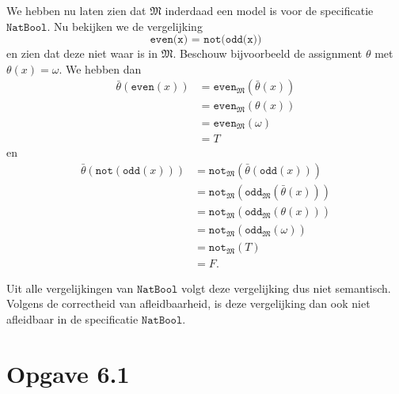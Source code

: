 \documentclass[a4paper,11pt]{article}
\begin{document}
We hebben nu laten zien dat $\mathfrak{M}$ inderdaad een model is voor de
specificatie $\texttt{NatBool}$. Nu bekijken we de vergelijking
\begin{displaymath}
\texttt{even(x) = not(odd(x))}
\end{displaymath}
en zien dat deze niet waar is in $\mathfrak{M}$. Beschouw bijvoorbeeld de
assignment $\theta$ met $\theta(x) = \omega$. We hebben dan
\begin{align*}
\bar \theta(\texttt{even}(x)) &= \texttt{even}_{\mathfrak{M}}(\bar \theta(x)) \\
                              &= \texttt{even}_{\mathfrak{M}}(\theta(x)) \\
                              &= \texttt{even}_{\mathfrak{M}}(\omega) \\
                              &= T
\end{align*}
en
\begin{align*}
\bar \theta(\texttt{not}(\texttt{odd}(x))) &= \texttt{not}_{\mathfrak{M}}(\bar \theta(\texttt{odd}(x))) \\
                                           &= \texttt{not}_{\mathfrak{M}}(\texttt{odd}_{\mathfrak{M}}(\bar \theta(x))) \\
                                           &= \texttt{not}_{\mathfrak{M}}(\texttt{odd}_{\mathfrak{M}}(\theta(x))) \\
                                           &= \texttt{not}_{\mathfrak{M}}(\texttt{odd}_{\mathfrak{M}}(\omega)) \\
                                           &= \texttt{not}_{\mathfrak{M}}(T) \\
                                           &= F.
\end{align*}

Uit alle vergelijkingen van $\texttt{NatBool}$ volgt deze vergelijking dus
niet semantisch. Volgens de correctheid van afleidbaarheid, is deze
vergelijking dan ook niet afleidbaar in de specificatie $\texttt{NatBool}$.


\section*{Opgave 6.1}
\end{document}
